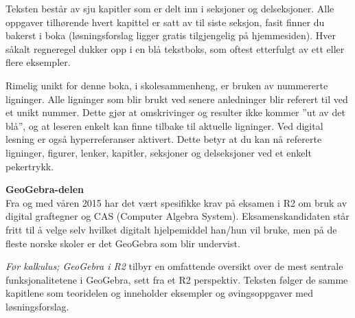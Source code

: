 Teksten består av sju kapitler som er delt inn i seksjoner og delseksjoner. Alle oppgaver tilhørende hvert kapittel er satt av til siste seksjon, fasit finner du bakerst i boka (løsningsforslag ligger gratis tilgjengelig på hjemmesiden). Hver såkalt regneregel dukker opp i en blå tekstboks, som oftest etterfulgt av ett eller flere eksempler.\vsk

Rimelig unikt for denne boka, i skolesammenheng, er bruken av nummererte ligninger. Alle ligninger som blir brukt ved senere anledninger blir referert til ved et unikt nummer. Dette gjør at omskrivinger og resulter ikke kommer ''ut av det blå'', og at leseren enkelt kan finne tilbake til aktuelle ligninger. Ved digital lesning er også hyperreferanser aktivert. Dette betyr at du kan nå refererte ligninger, figurer, lenker, kapitler, seksjoner og delseksjoner ved et enkelt pekertrykk.\vsk

\textbf{GeoGebra-delen}\\
Fra og med våren 2015 har det vært spesifikke krav på eksamen i R2 om bruk av digital graftegner og CAS (Computer Algebra System). Eksamenskandidaten står fritt til å velge selv hvilket digitalt hjelpemiddel han/hun vil bruke, men på de fleste norske skoler er det GeoGebra som blir undervist. \vsk

\textit{Før kalkulus; GeoGebra i R2} tilbyr en omfattende oversikt over de mest sentrale funksjonalitetene i GeoGebra, sett fra et R2 perspektiv. Teksten følger de samme kapitlene som teoridelen og inneholder eksempler og øvingsoppgaver med løsningsforslag.


